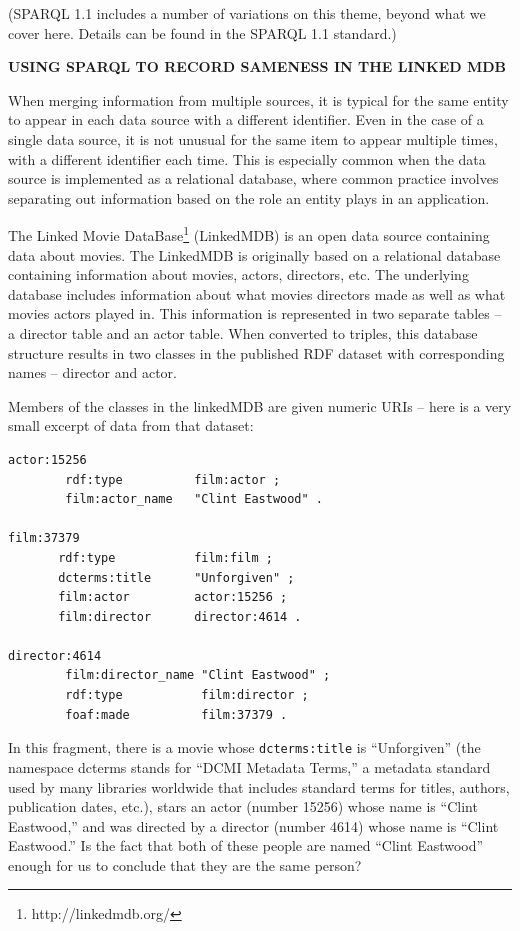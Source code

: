 (SPARQL 1.1 includes a number of variations on this theme, beyond what
we cover here. Details can be found in the SPARQL 1.1 standard.)

\begin{challenge} 
\textbf{USING SPARQL TO RECORD SAMENESS IN THE LINKED MDB}
\label{chal:3}

When merging information from multiple sources, it is typical for the
same entity to appear in each data source with a different identifier.
Even in the case of a single data source, it is not unusual for the same
item to appear multiple times, with a different identifier each time.
This is especially common when the data source is implemented as a
relational database, where common practice involves separating out
information based on the role an entity plays in an application.

The Linked Movie DataBase\footnote{http://linkedmdb.org/} (LinkedMDB) is an open data source containing
data about movies. The LinkedMDB is originally based on a relational database
containing information about movies, actors, directors, etc. The
underlying database includes information about what movies directors
made as well as what movies actors played in. This information is
represented in two separate tables -- a director table and an actor
table. When converted to triples, this database structure results in two
classes in the published RDF dataset with corresponding names --
director and actor.

Members of the classes in the linkedMDB are given numeric URIs -- here
is a very small excerpt of data from that dataset:

\begin{lstlisting}
actor:15256 
        rdf:type          film:actor ;
        film:actor_name   "Clint Eastwood" .

film:37379
       rdf:type           film:film ;
       dcterms:title      "Unforgiven" ;
       film:actor         actor:15256 ;
       film:director      director:4614 .

director:4614  
        film:director_name "Clint Eastwood" ;
        rdf:type           film:director ;
        foaf:made          film:37379 .

\end{lstlisting}

In this fragment, there is a movie whose \texttt{dcterms:title} is ``Unforgiven'' (the
namespace dcterms stands for ``DCMI Metadata Terms,'' a metadata standard used by
many libraries worldwide that includes standard terms for titles,
authors, publication dates, etc.), stars an actor (number 15256) whose
name is ``Clint Eastwood,'' and was directed by a director (number 4614)
whose name is ``Clint Eastwood.'' Is the fact that both of these people
are named ``Clint Eastwood'' enough for us to conclude that they are the
same person?


\end{challenge}
